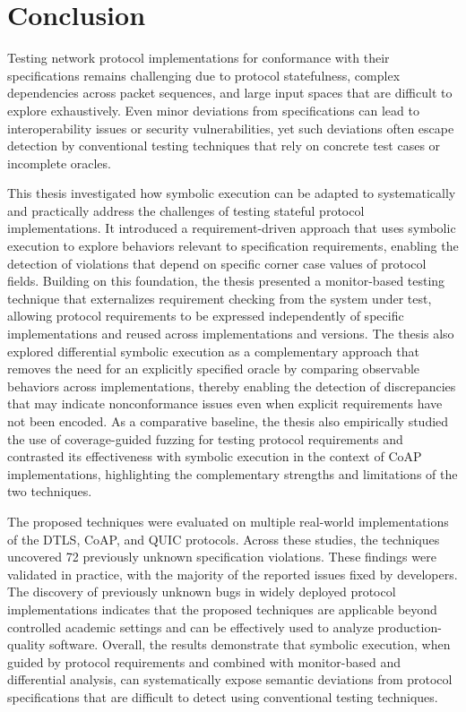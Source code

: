 \chapter{Conclusion}\label{chapter:conclusion}
Testing network protocol implementations for conformance with their specifications remains challenging due to protocol statefulness, complex dependencies across packet sequences, and large input spaces that are difficult to explore exhaustively.
Even minor deviations from specifications can lead to interoperability issues or security vulnerabilities, yet such deviations often escape detection by conventional testing techniques that rely on concrete test cases or incomplete oracles.

This thesis investigated how symbolic execution can be adapted to systematically and practically address the challenges of testing stateful protocol implementations.
It introduced a requirement-driven approach that uses symbolic execution to explore behaviors relevant to specification requirements, enabling the detection of violations that depend on specific corner case values of protocol fields.
Building on this foundation, the thesis presented a monitor-based testing technique that externalizes requirement checking from the system under test, allowing protocol requirements to be expressed independently of specific implementations and reused across implementations and versions.
The thesis also explored differential symbolic execution as a complementary approach that removes the need for an explicitly specified oracle by comparing observable behaviors across implementations, thereby enabling the detection of discrepancies that may indicate nonconformance issues even when explicit requirements have not been encoded.
As a comparative baseline, the thesis also empirically studied the use of coverage-guided fuzzing for testing protocol requirements and contrasted its effectiveness with symbolic execution in the context of CoAP implementations, highlighting the complementary strengths and limitations of the two techniques.

The proposed techniques were evaluated on multiple real-world implementations of the DTLS, CoAP, and QUIC protocols.
Across these studies, the techniques uncovered 72 previously unknown specification violations.
These findings were validated in practice, with the majority of the reported issues fixed by developers.
The discovery of previously unknown bugs in widely deployed protocol implementations indicates that the proposed techniques are applicable beyond controlled academic settings and can be effectively used to analyze production-quality software.
Overall, the results demonstrate that symbolic execution, when guided by protocol requirements and combined with monitor-based and differential analysis, can systematically expose semantic deviations from protocol specifications that are difficult to detect using conventional testing techniques.